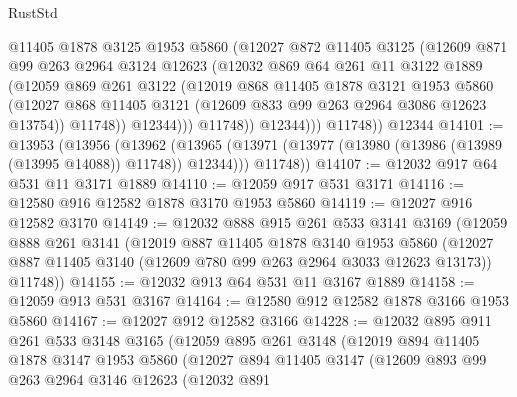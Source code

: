 \begin{lexlean}{RustStd}
\begin{coremodule}
{\begin{coremodule}
{{{{{{{{{{{{{{{{{{{{{{{{{{{{{                  @11405
                  @1878
                  @3125
                  @1953
                  @5860
                  (@12027
                    @872
                    @11405
                    @3125
                    (@12609
                      @871
                      @99
                      @263
                      @2964
                      @3124
                      @12623
                      (@12032
                        @869
                        @64
                        @261
                        @11
                        @3122
                        @1889
                        (@12059
                          @869
                          @261
                          @3122
                          (@12019
                            @868
                            @11405
                            @1878
                            @3121
                            @1953
                            @5860
                            (@12027
                              @868
                              @11405
                              @3121
                              (@12609 @833 @99 @263 @2964 @3086 @12623 @13754))
                            @11748))
                        @12344)))
                  @11748))
              @12344)))
        @11748))
    @12344
@14101 := @13953
    (@13956
      (@13962
        (@13965 (@13971 (@13977 (@13980 (@13986 (@13989 (@13995 @14088)) @11748)) @12344)))
        @11748))
@14107 := @12032 @917 @64 @531 @11 @3171 @1889
@14110 := @12059 @917 @531 @3171
@14116 := @12580 @916 @12582 @1878 @3170 @1953 @5860
@14119 := @12027 @916 @12582 @3170
@14149 := @12032
    @888
    @915
    @261
    @533
    @3141
    @3169
    (@12059
      @888
      @261
      @3141
      (@12019
        @887
        @11405
        @1878
        @3140
        @1953
        @5860
        (@12027 @887 @11405 @3140 (@12609 @780 @99 @263 @2964 @3033 @12623 @13173))
        @11748))
@14155 := @12032 @913 @64 @531 @11 @3167 @1889
@14158 := @12059 @913 @531 @3167
@14164 := @12580 @912 @12582 @1878 @3166 @1953 @5860
@14167 := @12027 @912 @12582 @3166
@14228 := @12032
    @895
    @911
    @261
    @533
    @3148
    @3165
    (@12059
      @895
      @261
      @3148
      (@12019
        @894
        @11405
        @1878
        @3147
        @1953
        @5860
        (@12027
          @894
          @11405
          @3147
          (@12609
            @893
            @99
            @263
            @2964
            @3146
            @12623
            (@12032
              @891
}}}}}}}}}}}}}}}}}}}}}}}}}}}}}
\end{coremodule}}
\end{coremodule}
\end{lexlean}
